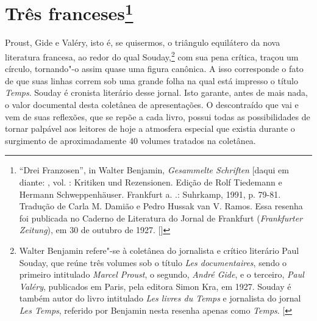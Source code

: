 \chapter{Três franceses\footnote[*]{``Drei Franzosen'',
  in Walter Benjamin, \emph{Gesammelte Schriften} {[}daqui em diante:
  \versal{GS}{]}, vol. : Kritiken und Rezensionen. Edição de Rolf Tiedemann e
  Hermann Schweppenhäuser. Frankfurt a. .: Suhrkamp, 1991, p. 79-81.
  Tradução de Carla M. Damião e Pedro Hussak van V. Ramos. Essa resenha
  foi publicada no Caderno de Literatura do Jornal de Frankfurt
  (\emph{Frankfurter Zeitung}), em 30 de outubro de 1927.
  []}}

Proust, Gide e Valéry, isto é, se quisermos, o triângulo equilátero da
nova literatura francesa, ao redor do qual Souday,\footnote{Walter
  Benjamin refere"-se à coletânea do jornalista e crítico literário Paul
  Souday, que reúne três volumes sob o título \emph{Les documentaires},
  sendo o primeiro intitulado \emph{Marcel Proust}, o segundo,
  \emph{André Gide}, e o terceiro, \emph{Paul Valéry}, publicados em
  Paris, pela editora Simon Kra, em 1927. Souday é também autor do livro
  intitulado \emph{Les livres du Temps} e jornalista do jornal \emph{Les
  Temps}, referido por Benjamin nesta resenha apenas como \emph{Temps}.
  {[}\versal{N. E.}{]}} com sua pena crítica, traçou um círculo, tornando"-o assim
quase uma figura canônica. A isso corresponde o fato de que suas linhas
correm sob uma grande folha na qual está impresso o título \emph{Temps}.
Souday é cronista literário desse jornal. Isto garante, antes de mais
nada, o valor documental desta coletânea de apresentações. O
descontraído que vai e vem de suas reflexões, que se repõe a cada livro,
possui todas as possibilidades de tornar palpável aos leitores de hoje a
atmosfera especial que existia durante o surgimento de aproximadamente
40 volumes tratados na coletânea.

